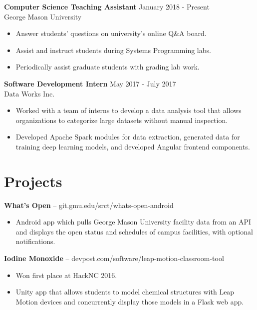 \documentclass[11pt]{res} %
\begin{document}
\begin{resume}
\vspace{-8pt}\textbf{Computer Science Teaching Assistant} \hfill January 2018 - Present \\
George Mason University\smallskip
\begin{itemize}
\item Answer students' questions on university's online Q\&A board.
\item Assist and instruct students during Systems Programming labs.
\item Periodically assist graduate students with grading lab work.
\end{itemize}

\vspace{-8pt}\textbf{Software Development Intern} \hfill May 2017 - July 2017 \\
Data Works Inc.\smallskip
\begin{itemize}
\item Worked with a team of interns to develop a data analysis tool that allows organizations to categorize large datasets without manual inspection.
\item Developed Apache Spark modules for data extraction, generated data for training deep learning models, and developed Angular frontend components.
\end{itemize}

\vspace{-15pt}
\noindent\makebox[\linewidth]{\rule{\textwidth}{1pt}}


\vspace{-10pt}\section{\LARGE Projects} \smallskip

\textbf{What's Open} -- git.gmu.edu/srct/whats-open-android \smallskip
\begin{itemize}
\item Android app which pulls George Mason University facility data from an API and displays the open status and schedules of campus facilities, with optional notifications.
\end{itemize}

\vspace{-8pt}\textbf{Iodine Monoxide} -- devpost.com/software/leap-motion-classroom-tool \smallskip
\begin{itemize}
\item Won first place at HackNC 2016.
\item Unity app that allows students to model chemical structures with Leap Motion devices and concurrently display those models in a Flask web app.
\end{itemize}


\end{resume}
\end{document}
